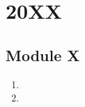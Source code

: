 \documentclass{../../../src/solutionsmannual}
\begin{document}
  

\chapter{20XX}
\section{Module X}
\begin{enumerate}[label=\bfseries  \arabic*.]\setcounter{enumi}{0}
\item 
\item 
\end{enumerate}
\end{document}
